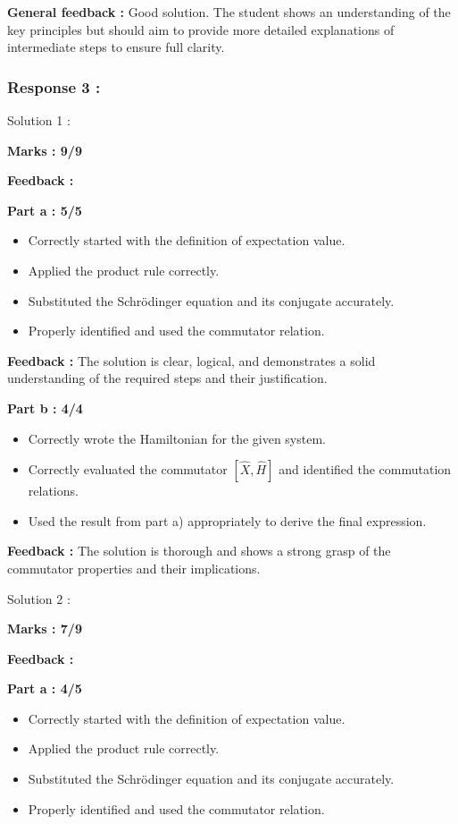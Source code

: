 \documentclass[a4paper,11pt]{article}
\begin{document}
\textbf{General feedback :}
Good solution. The student shows an understanding of the key principles but should aim to provide more detailed explanations of intermediate steps to ensure full clarity.



\subsubsection*{Response 3 :}

Solution 1 :

\textbf{Marks : 9/9}

\textbf{Feedback :}

\textbf{Part a : 5/5}

\begin{itemize}
    \item Correctly started with the definition of expectation value.
    \item Applied the product rule correctly.
    \item Substituted the Schrödinger equation and its conjugate accurately.
    \item Properly identified and used the commutator relation.
\end{itemize}

\textbf{Feedback :}
The solution is clear, logical, and demonstrates a solid understanding of the required steps and their justification.


\textbf{Part b : 4/4}

\begin{itemize}
    \item Correctly wrote the Hamiltonian for the given system.
    \item Correctly evaluated the commutator $[\hat{X}, \hat{H}]$ and identified the commutation relations.
    \item Used the result from part a) appropriately to derive the final expression.
\end{itemize}

\textbf{Feedback :}
The solution is thorough and shows a strong grasp of the commutator properties and their implications.


Solution 2 :

\textbf{Marks : 7/9}

\textbf{Feedback :}

\textbf{Part a : 4/5}

\begin{itemize}
    \item Correctly started with the definition of expectation value.
    \item Applied the product rule correctly.
    \item Substituted the Schrödinger equation and its conjugate accurately.
    \item Properly identified and used the commutator relation.
\end{itemize}
\end{document}
